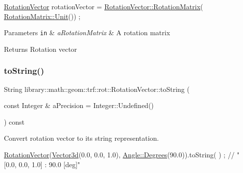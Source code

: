 \begin{DoxyCode}
\hyperlink{classlibrary_1_1math_1_1geom_1_1trf_1_1rot_1_1_rotation_vector_a32b1fab5e81bc24d777324daf5849205}{RotationVector} rotationVector = \hyperlink{classlibrary_1_1math_1_1geom_1_1trf_1_1rot_1_1_rotation_vector_a87fd9cff1e806199ed150569a6e98889}{RotationVector::RotationMatrix}(
      \hyperlink{classlibrary_1_1math_1_1geom_1_1trf_1_1rot_1_1_rotation_matrix_aac59b7dafc34767d24d0934f4b86bef0}{RotationMatrix::Unit}()) ;
\end{DoxyCode}



\begin{DoxyParams}[1]{Parameters}
\mbox{\tt in}  & {\em a\+Rotation\+Matrix} & A rotation matrix \\
\hline
\end{DoxyParams}
\begin{DoxyReturn}{Returns}
Rotation vector 
\end{DoxyReturn}
\mbox{\label{classlibrary_1_1math_1_1geom_1_1trf_1_1rot_1_1_rotation_vector_a9da9879150e3103d7d67def6b44de7c9}} 
\subsubsection{\texorpdfstring{to\+String()}{toString()}}
{\footnotesize\ttfamily String library\+::math\+::geom\+::trf\+::rot\+::\+Rotation\+Vector\+::to\+String (\begin{DoxyParamCaption}\item[{const Integer \&}]{a\+Precision = {\ttfamily Integer\+:\+:Undefined()} }\end{DoxyParamCaption}) const}



Convert rotation vector to its string representation. 


\begin{DoxyCode}
\hyperlink{classlibrary_1_1math_1_1geom_1_1trf_1_1rot_1_1_rotation_vector_a32b1fab5e81bc24d777324daf5849205}{RotationVector}(\hyperlink{namespacelibrary_1_1math_1_1obj_a977e84e9bf317a4e7dd9d6d671d6da2f}{Vector3d}(0.0, 0.0, 1.0), \hyperlink{classlibrary_1_1math_1_1geom_1_1_angle_a64aa53e8420aeb6f671d86c65c370bc8}{Angle::Degrees}(90.0)).toString(
      ) ; \textcolor{comment}{// "[0.0, 0.0, 1.0] : 90.0 [deg]"}
\end{DoxyCode}



